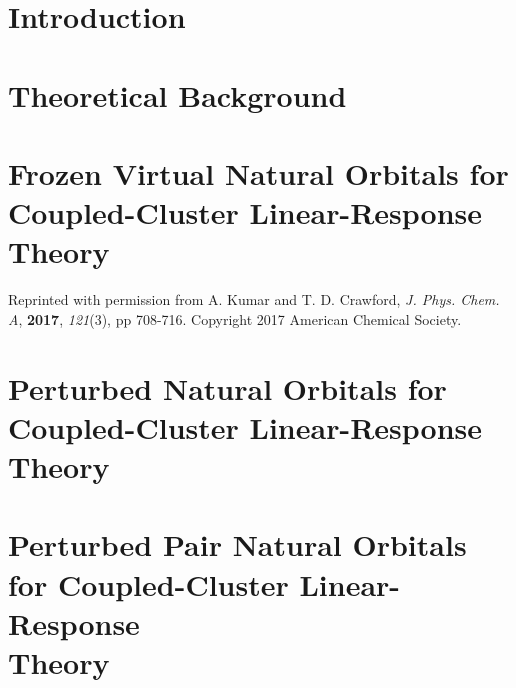 \documentclass[12pt]{report}
\begin{document}
\chapter{Introduction}

\chapter{Theoretical Background}

\chapter{Frozen Virtual Natural Orbitals for Coupled-Cluster Linear-Response\\Theory}
Reprinted with permission from A. Kumar and T. D. Crawford, {\em J. Phys. Chem. A}, \textbf{2017}, {\em 121}(3), pp 708-716. Copyright 2017 American Chemical Society.

\chapter{Perturbed Natural Orbitals for Coupled-Cluster Linear-Response Theory}

\chapter{Perturbed Pair Natural Orbitals for Coupled-Cluster Linear-Response\\Theory}

\end{document}
